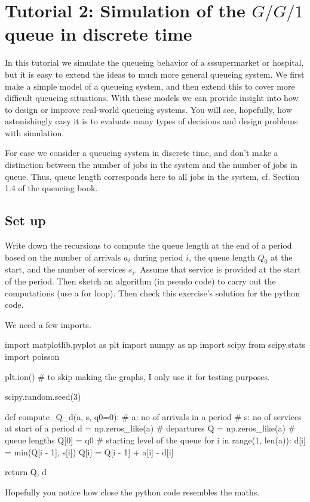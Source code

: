 \section{Tutorial 2: Simulation of the $G/G/1$ queue in discrete time}
\label{sec:single-server-queue}

In this tutorial we simulate the queueing behavior of a sssupermarket or hospital, but it is easy to extend the ideas to much more general queueing system.
We first make a simple model of a queueing system, and then extend this to cover  more difficult queueing situations.
With these models we can provide insight into how to design or improve real-world queueing systems.
You will see, hopefully, how astonishingly easy it is to evaluate many types of decisions and design problems with simulation.

For ease we  consider a queueing system in discrete time, and don't make a distinction between the number of jobs in the system and the number of jobs in queue. Thus, queue length corresponds here to all jobs in the system, cf. Section 1.4 of the queueing book.

\subsection{Set up}
\label{sec:set-up}


\begin{exercise}
  Write down the recursions to compute the queue length at the end of a period based on the number of arrivals $a_i$ during period $i$, the queue length $Q_0$ at the start, and the number of services $s_i$.
  Assume that service is provided at the start of the period.
  Then sketch an algorithm (in pseudo code) to carry out the computations (use a for loop).
  Then check this exercise's solution for the python code.

\begin{solution}
    We need a few imports.
\begin{pyverbatim}
import matplotlib.pyplot as plt
import numpy as np
import scipy
from scipy.stats import poisson

plt.ion()  # to skip making the graphs, I only use it for testing purposes.

scipy.random.seed(3)


def compute_Q_d(a, s, q0=0):
    # a: no of arrivals in a period
    # s: no of services at start of a period
    d = np.zeros_like(a)  # departures
    Q = np.zeros_like(a)  # queue lengths
    Q[0] = q0  # starting level of the queue
    for i in range(1, len(a)):
        d[i] = min(Q[i - 1], s[i])
        Q[i] = Q[i - 1] + a[i] - d[i]

    return Q, d
\end{pyverbatim}
Hopefully you notice how close the python code resembles the maths.
  \end{solution}

\end{exercise}


